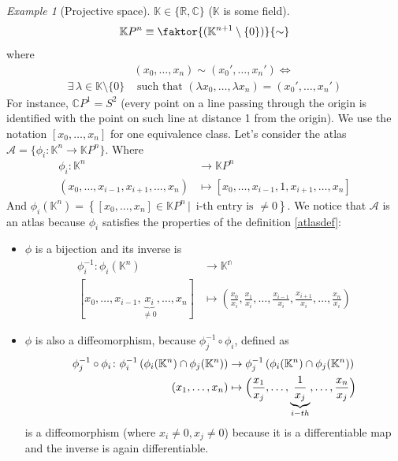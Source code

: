 \documentclass[a4paper,11pt,titlepage, article, oneside]{memoir}
\numberwithin{equation}{section}
\theoremstyle{definition}
\theoremstyle{remark}
\newtheorem{example}[theorem]{Example}
\newcommand{\rfield}{\mathbb{R}}
\begin{document}
\begin{tcolorbox}\begin{example}[Projective space]
  $\mathbb{K} \in \{\rfield, \mathbb{C}\}$ ($\mathbb{K}$ is some field).
  $$\mathbb{K}P^n \equiv \faktor{(\mathbb{K}^{n+1} \setminus \{0\})}{\sim}$$
  where
  \begin{align*}&(x_0, \ldots, x_n) \sim (x_0', \ldots, x_n') \Longleftrightarrow \\
     \exists \, \lambda \in \mathbb{K}\setminus \{0\} &\text{ such that } (\lambda x_0, \ldots, \lambda x_n) = (x_0', \ldots, x_n')
  \end{align*}
  For instance, $\mathbb{C}P^1 = S^2$ (every point on a line passing through the origin is identified with the point on such line at distance 1 from the origin). We use the notation $[x_0, \ldots, x_n]$ for one equivalence class.
  Let's consider the atlas $\mathcal{A} = \{\phi_i \colon \mathbb{K}^n \rightarrow \mathbb{K} P^n \}$. Where
  \begin{align*}
    \phi_i \colon \mathbb{K}^n &\rightarrow \mathbb{K}P^n \\
    (x_0, \ldots, x_{i-1}, x_{i+1}, \ldots, x_n) &\mapsto [x_0, \ldots, x_{i-1}, 1, x_{i+1}, \ldots, x_n]
  \end{align*}
  And $\phi_i(\mathbb{K}^n) = \left\{[x_0, \ldots, x_n] \in \mathbb{K}P^n \, | \, \text{ i-th entry is } \not = 0 \right \}$.
  We notice that $\mathcal{A}$ is an atlas because $\phi_i$ satisfies the properties of the definition \ref{atlasdef}:
  \begin{itemize}
    \item $\phi$ is a bijection and its inverse is
    \begin{align*}
      \phi_i^{-1} \colon \phi_i(\mathbb{K}^n) & \rightarrow \mathbb{K^n} \\
      [x_0, \ldots, x_{i-1}, \underbrace{x_i}_{\not = 0}, \ldots, x_n] &\mapsto \left( \frac{x_0}{x_i}, \frac{x_1}{x_i}, \ldots, \frac{x_{i-1}}{x_i}, \frac{x_{i+1}}{x_i}, \ldots, \frac{x_n}{x_i} \right)
    \end{align*}
    \item $\phi$ is also a diffeomorphism, because $\phi_j^{-1} \circ \phi_i$, defined as
    \begin{align*}
      \phi_j^{-1} \circ \phi_i \colon \phi_i^{-1} \left(\phi_i(\mathbb{K}^n) \cap \phi_j(\mathbb{K}^n) \right) &\rightarrow \phi_j^{-1} \left(\phi_i(\mathbb{K}^n) \cap \phi_j(\mathbb{K}^n) \right) \\
      (x_1, \ldots, x_n) &\mapsto \Bigl( \frac{x_1}{x_j}, \ldots, \underbrace{\frac{1}{x_j}}_{i-th}, \ldots, \frac{x_n}{x_j} \Bigr)
    \end{align*}
    is a diffeomorphism (where $x_i \not = 0, x_j \not = 0$) because it is a differentiable map and the inverse is again differentiable.
  \end{itemize}
\end{example}\end{tcolorbox}
\end{document}
